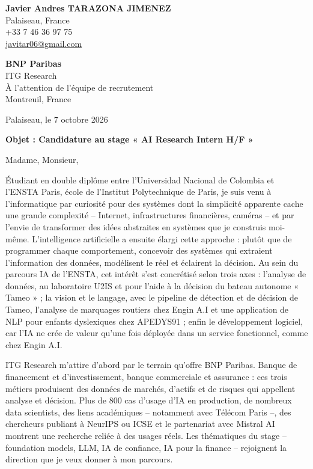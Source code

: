 \documentclass[a4paper,11pt]{article}
\begin{document}
{\bfseries Javier Andres TARAZONA JIMENEZ}\\
Palaiseau, France\\
+33 7 46 36 97 75\\
\href{mailto:javitar06@gmail.com}{javitar06@gmail.com}

\hfill\begin{minipage}[t]{0.42\textwidth}
{\bfseries BNP Paribas}\\
ITG Research\\
À l'attention de l'équipe de recrutement\\
Montreuil, France
\end{minipage}

\vspace{4pt}
\hfill Palaiseau, le 7 octobre 2026

\vspace{2pt}
\textbf{Objet : Candidature au stage « AI Research Intern H/F »}

Madame, Monsieur,

Étudiant en double diplôme entre l'Universidad Nacional de Colombia et l'ENSTA Paris, école de l'Institut Polytechnique de Paris, je suis venu à l'informatique par curiosité pour des systèmes dont la simplicité apparente cache une grande complexité -- Internet, infrastructures financières, caméras -- et par l'envie de transformer des idées abstraites en systèmes que je construis moi-même. L'intelligence artificielle a ensuite élargi cette approche : plutôt que de programmer chaque comportement, concevoir des systèmes qui extraient l'information des données, modélisent le réel et éclairent la décision. Au sein du parcours IA de l'ENSTA, cet intérêt s'est concrétisé selon trois axes : l'analyse de données, au laboratoire U2IS et pour l'aide à la décision du bateau autonome « Tameo » ; la vision et le langage, avec le pipeline de détection et de décision de Tameo, l'analyse de marquages routiers chez Engin A.I et une application de NLP pour enfants dyslexiques chez APEDYS91 ; enfin le développement logiciel, car l'IA ne crée de valeur qu'une fois déployée dans un service fonctionnel, comme chez Engin A.I.

ITG Research m'attire d'abord par le terrain qu'offre BNP Paribas. Banque de financement et d'investissement, banque commerciale et assurance : ces trois métiers produisent des données de marchés, d'actifs et de risques qui appellent analyse et décision. Plus de 800 cas d'usage d'IA en production, de nombreux data scientists, des liens académiques -- notamment avec Télécom Paris --, des chercheurs publiant à NeurIPS ou ICSE et le partenariat avec Mistral AI montrent une recherche reliée à des usages réels. Les thématiques du stage -- foundation models, LLM, IA de confiance, IA pour la finance -- rejoignent la direction que je veux donner à mon parcours.
\end{document}
